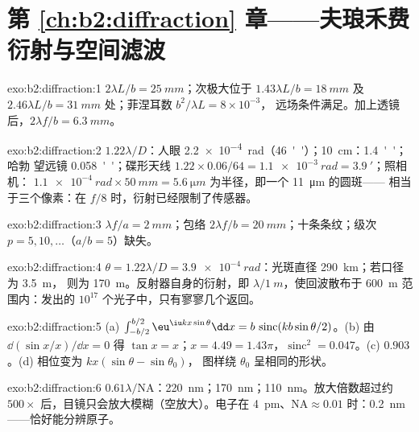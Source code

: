 \section*{第 \ref{ch:b2:diffraction} 章——夫琅禾费衍射与空间滤波}

\begin{solution}{exo:b2:diffraction:1}
$2\lambda L/b = \qty{25}{mm}$；次极大位于 $1.43\lambda L/b = \qty{18}{mm}$ 及
$2.46\lambda L/b = \qty{31}{mm}$ 处；菲涅耳数 $b^2/\lambda L = 8 \times 10^{-3}$，
远场条件满足。加上透镜后，$2\lambda f/b = \qty{6.3}{mm}$。
\end{solution}

\begin{solution}{exo:b2:diffraction:2}
$1.22\lambda/D$：人眼 \qty{2.2e-4}{rad}（\qty{46}{''}）；\qty{10}{cm}：\qty{1.4}{''}；哈勃
望远镜 \qty{0.058}{''}；碟形天线 $1.22 \times 0.06/64 = \qty{1.1e-3}{rad} = \qty{3.9}{'}$；照相机：
$\qty{1.1e-4}{rad} \times \qty{50}{mm} = \qty{5.6}{\micro m}$ 为半径，即一个 \qty{11}{\micro m} 的圆斑——
相当于三个像素：在 $f/8$ 时，衍射已经限制了传感器。
\end{solution}

\begin{solution}{exo:b2:diffraction:3}
$\lambda f/a = \qty{2}{mm}$；包络 $2\lambda f/b = \qty{20}{mm}$；十条条纹；级次
$p = 5, 10, \dots$（$a/b = 5$）缺失。
\end{solution}

\begin{solution}{exo:b2:diffraction:4}
$\theta = 1.22\lambda/D = \qty{3.9e-4}{rad}$：光斑直径 \qty{290}{km}；若口径为 \qty{3.5}{m}，
则为 \qty{170}{m}。反射器自身的衍射，即 $\lambda/\qty{1}{m}$，使回波散布于
\qty{600}{m} 范围内：发出的 $10^{17}$ 个光子中，只有寥寥几个返回。
\end{solution}

\begin{solution}{exo:b2:diffraction:5}
(a) $\int_{-b/2}^{b/2}\eu^{\iu kx\sin\theta}\dd x = b\,\operatorname{sinc}(kb\sin\theta/2)$。(b)
由 $\dd(\sin x/x)/\dd x = 0$ 得 $\tan x = x$；$x = 4.49 = 1.43\pi$，$\operatorname{sinc}^2 =
0.047$。(c) $0.903$。(d) 相位变为 $kx(\sin\theta - \sin\theta_0)$，
图样绕 $\theta_0$ 呈相同的形状。
\end{solution}

\begin{solution}{exo:b2:diffraction:6}
$0.61\lambda/\mathrm{NA}$：\qty{220}{nm}；\qty{170}{nm}；\qty{110}{nm}。放大倍数超过约 $500\times$
后，目镜只会放大模糊（空放大）。电子在
\qty{4}{pm}、$\mathrm{NA} \approx 0.01$ 时：\qty{0.2}{nm}——恰好能分辨原子。
\end{solution}

